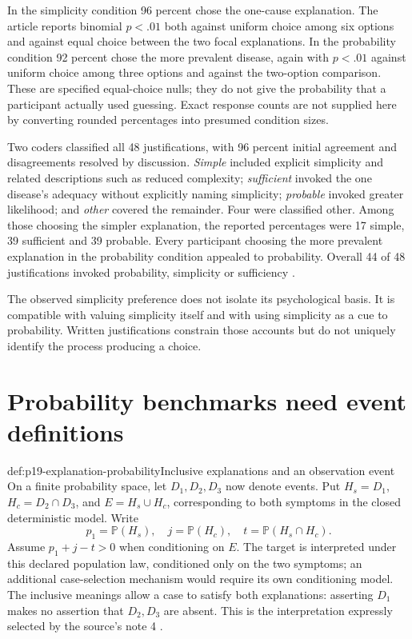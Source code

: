 In the simplicity condition 96 percent chose the one-cause
explanation. The article reports binomial \(p<.01\) both against
uniform choice among six options and against equal choice between
the two focal explanations. In the probability condition 92 percent
chose the more prevalent disease, again with \(p<.01\) against
uniform choice among three options and against the two-option
comparison. These are specified equal-choice nulls; they do not
give the probability that a participant actually used guessing.
Exact response counts are not supplied here by converting rounded
percentages into presumed condition sizes.

Two coders classified all 48 justifications, with 96 percent
initial agreement and disagreements resolved by discussion.
\emph{Simple} included explicit simplicity and related descriptions
such as reduced complexity; \emph{sufficient} invoked the one
disease's adequacy without explicitly naming simplicity;
\emph{probable} invoked greater likelihood; and \emph{other}
covered the remainder. Four were classified other.
Among those choosing the simpler explanation, the reported
percentages were 17 simple, 39 sufficient and 39 probable.
Every participant choosing the more prevalent explanation in
the probability condition appealed to probability.
Overall 44 of 48 justifications invoked probability, simplicity
or sufficiency \cite[pp.~237--238]{Lombrozo2007SimplicityProbability}.

The observed simplicity preference does not isolate its psychological
basis. It is compatible with valuing simplicity itself and with
using simplicity as a cue to probability. Written justifications
constrain those accounts but do not uniquely identify the process
producing a choice.

\section{Probability benchmarks need event definitions}
\label{sec:p19-explanation-probability}

\begin{hbdefinition}{def:p19-explanation-probability}{Inclusive explanations and an observation event}
On a finite probability space, let \(D_1,D_2,D_3\) now denote
events. Put \(H_s=D_1\), \(H_c=D_2\cap D_3\), and
\(E=H_s\cup H_c\), corresponding to both symptoms in the closed
deterministic model. Write
\[
 p_1=\mathbb P(H_s),\quad j=\mathbb P(H_c),\quad
 t=\mathbb P(H_s\cap H_c).
\]
Assume \(p_1+j-t>0\) when conditioning on \(E\).
The target is interpreted under this declared population law,
conditioned only on the two symptoms; an additional case-selection
mechanism would require its own conditioning model.
The inclusive meanings allow a case to satisfy both explanations:
asserting \(D_1\) makes no assertion that \(D_2,D_3\) are absent.
This is the interpretation expressly selected by the source's
note 4 \cite[p.~240]{Lombrozo2007SimplicityProbability}.
\end{hbdefinition}

